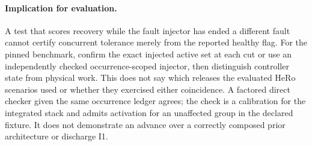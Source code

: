 \documentclass{article}
\begin{document}
\paragraph{Implication for evaluation.}
A test that scores recovery while the fault injector has ended a
different fault cannot certify concurrent tolerance merely from the
reported healthy flag. For the pinned benchmark, confirm the exact
injected active set at each cut or use an independently checked
occurrence-scoped injector, then distinguish controller state from
physical work. This does not say which releases the evaluated HeRo
scenarios used or whether they exercised either coincidence. A factored
direct checker given the same occurrence ledger agrees; the check is
a calibration for the integrated stack and admits activation
for an unaffected group in the declared fixture. It does not
demonstrate an advance over a correctly composed prior architecture or
discharge I1.
\end{document}
